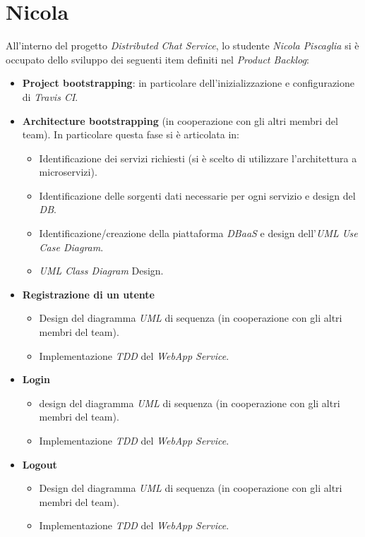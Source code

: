 \section{Nicola}
All'interno del progetto \textit{Distributed Chat Service}, lo studente \textit{Nicola Piscaglia} si è occupato dello sviluppo dei seguenti item definiti nel \textit{Product Backlog}:
\begin{itemize}
    \item \textbf{Project bootstrapping}: in particolare dell'inizializzazione e configurazione di \textit{Travis CI}.
    
    \item \textbf{Architecture bootstrapping} (in cooperazione con gli altri membri del team). In particolare questa fase si è articolata in:
    \begin{itemize}
        \item Identificazione dei servizi richiesti (si è scelto di utilizzare l'architettura a microservizi).
        \item Identificazione delle sorgenti dati necessarie per ogni servizio e design del \textit{DB}.
        \item Identificazione/creazione della piattaforma \textit{DBaaS} e design dell'\textit{UML Use Case Diagram}.
        \item \textit{UML Class Diagram} Design.
    \end{itemize}
    
    \item \textbf{Registrazione di un utente}
        \begin{itemize}
            \item Design del diagramma \textit{UML} di sequenza (in cooperazione con gli altri membri del team).
            \item Implementazione \textit{TDD} del \textit{WebApp Service}.
        \end{itemize}
    
    \item \textbf{Login}
        \begin{itemize}
            \item design del diagramma \textit{UML} di sequenza (in cooperazione con gli altri membri del team).
            \item Implementazione \textit{TDD} del \textit{WebApp Service}.
        \end{itemize}
    
    \item \textbf{Logout}
        \begin{itemize}
            \item Design del diagramma \textit{UML} di sequenza (in cooperazione con gli altri membri del team).
            \item Implementazione \textit{TDD} del \textit{WebApp Service}.
        \end{itemize}
        

\end{itemize}
